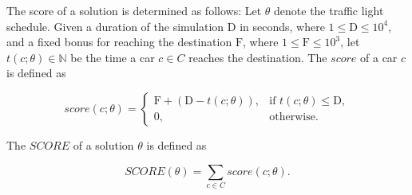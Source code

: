 The score of a solution is determined as follows: Let $\theta$ denote the traffic light schedule. Given a duration of the simulation $\mathrm{D}$ in seconds, where $1 \leq \mathrm{D} \leq 10^4$, and a fixed bonus for reaching the destination $\mathrm{F}$, where $1 \leq \mathrm{F} \leq 10^3$, let $t(c; \theta) \in \mathbb{N}$ be the time a car $c \in C$ reaches the destination. The $score$ of a car $c$ is defined as

\begin{equation}
    score(c; \theta) =
    \begin{cases}
        \mathrm{F} + (\mathrm{D} - t(c; \theta)), & \text{if $t(c; \theta) \leq \mathrm{D}$}, \\
        0, & \text{otherwise}.
    \end{cases}
\end{equation}


The $SCORE$ of a solution $\theta$ is defined as

\begin{equation}
    SCORE(\theta) = \sum_{c \in C} score(c; \theta).
\end{equation}
